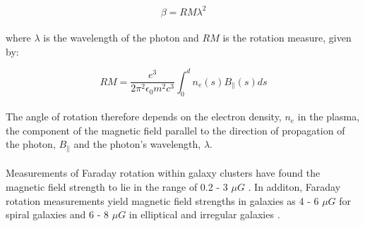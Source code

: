 \begin{equation}
\beta = RM\lambda^2
\end{equation}
\\
where $\lambda$ is the wavelength of the photon and $RM$ is the rotation measure, given by:

\begin{equation}
RM = \frac{e^3}{2\pi ^2 \epsilon_0 m^2 c^3}\int_{0}^{d} n_e(s) B_{\|}(s) ds
\end{equation}
\\
The angle of rotation therefore depends on the electron density, $n_e$ in the plasma, the component of the magnetic field parallel to the direction of propagation of the photon, $B_{\|}$ and the photon's wavelength, $\lambda$.
\\\\
Measurements of Faraday rotation within galaxy clusters have found the magnetic field strength to lie in the range of 0.2 - 3 $\mu G$ \cite{Widrow:2002ud}. In additon, Faraday rotation measurements yield magnetic field strengths in galaxies as 4 - 6 $\mu G$ for spiral galaxies and 6 - 8 $\mu G$ in elliptical and irregular galaxies \cite{Widrow:2002ud}.

